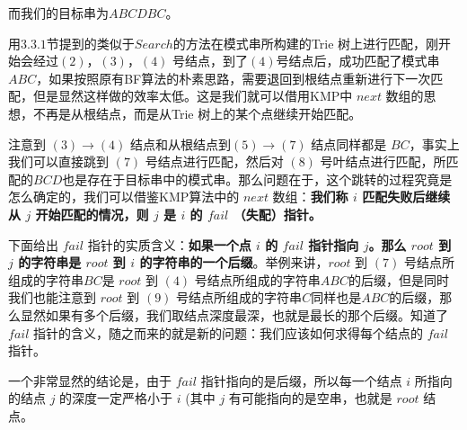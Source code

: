 \documentclass[UTF8]{ctexart}
\begin{document}
而我们的目标串为\textcolor[rgb]{0,0,1}{$ABCDBC$}。 \par

用$3.3.1$节提到的类似于$Search$的方法在模式串所构建的Trie 树上进行匹配，刚开始会经过\textcolor[rgb]{0,0,1}{$(2)$}，\textcolor[rgb]{0,0,1}{$(3)$}，\textcolor[rgb]{0,0,1}{$(4)$} 号结点，到了$(4)$号结点后，成功匹配了模式串\textcolor[rgb]{1,0,0}{$ABC$}，如果按照原有BF算法的朴素思路，需要退回到根结点重新进行下一次匹配，但是显然这样做的效率太低。这是我们就可以借用KMP中 $next$ 数组的思想，不再是从根结点，而是从Trie 树上的某个点继续开始匹配。 \par

注意到 \textcolor[rgb]{0,0,1}{$(3) \to (4)$} 结点和从根结点到\textcolor[rgb]{0,0,1}{$(5) \to (7)$} 结点同样都是 \textcolor[rgb]{1,0,0}{$BC$}，事实上我们可以直接跳到 \textcolor[rgb]{0,0,1}{$(7)$} 号结点进行匹配，然后对 \textcolor[rgb]{0,0,1}{$(8)$} 号叶结点进行匹配，所匹配的\textcolor[rgb]{1,0,0}{$BCD$}也是存在于目标串中的模式串。那么问题在于，这个跳转的过程究竟是怎么确定的，我们可以借鉴KMP算法中的 $next$ 数组：\textbf{我们称 $i$ 匹配失败后继续从 $j$ 开始匹配的情况，则 $j$ 是 $i$ 的 $fail$ （失配）指针。} \par

下面给出 $fail$ 指针的实质含义：\textbf{如果一个点 $i$ 的 $fail$ 指针指向 $j$。那么 $root$ 到 $j$ 的字符串是 $root$ 到 $i$ 的字符串的一个后缀}。举例来讲，$root$ 到 \textcolor[rgb]{0,0,1}{$(7)$} 号结点所组成的字符串\textcolor[rgb]{1,0,0}{$BC$}是 $root$ 到 \textcolor[rgb]{0,0,1}{$(4)$} 号结点所组成的字符串\textcolor[rgb]{1,0,0}{$ABC$}的后缀，但是同时我们也能注意到 $root$ 到 \textcolor[rgb]{0,0,1}{$(9)$} 号结点所组成的字符串\textcolor[rgb]{1,0,0}{$C$}同样也是\textcolor[rgb]{1,0,0}{$ABC$}的后缀，那么显然如果有多个后缀，我们取结点深度最深，也就是最长的那个后缀。知道了 $fail$ 指针的含义，随之而来的就是新的问题：我们应该如何求得每个结点的 $fail$ 指针。\par

一个非常显然的结论是，由于 $fail$ 指针指向的是后缀，所以每一个结点 $i$ 所指向的结点 $j$ 的深度一定严格小于 $i$ (其中 $j$ 有可能指向的是空串，也就是 $root$ 结点。
\end{document}
